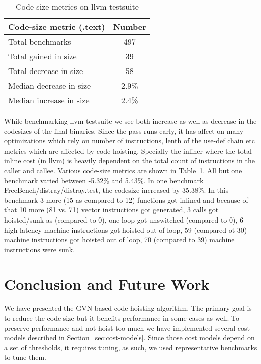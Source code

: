 \documentclass{sig-alternate}
\begin{document}
\begin{table}[h!]
  \begin{center}
    \begin{tabular}{|l|c|}
      \hline
      Code-size metric  (.text)                   & Number   \\\hline
      Total  benchmarks                           & 497      \\\hline
      Total  gained in size                       & 39       \\\hline
      Total  decrease in size                     & 58       \\\hline
      Median decrease in size                     & 2.9\%    \\\hline
      Median increase in size                     & 2.4\%    \\\hline
    \end{tabular}
  \end{center}
  \caption{Code size metrics on llvm-testsuite}
  \label{tab:code-size}
\end{table}

While benchmarking llvm-testsuite we see both increase as well as decrease in
the codesizes of the final binaries. Since the pass runs early, it has affect on
many optimizations which rely on number of instructions, lenth of the use-def
chain etc metrics which are affected by code-hoisting. Specially the inliner
where the total inline cost (in llvm) is heavily dependent on the total count of
instructions in the caller and callee. Various code-size metrics are shown in
Table~\ref{tab:code-size}. All but one benchmark varied between -5.32\% and
5.43\%.  In one benchmark FreeBench/distray/distray.test, the codesize increased
by 35.38\%. In this benchmark 3 more (15 as compared to 12) functions got
inlined and because of that 10 more (81 vs. 71) vector instructions got
generated, 3 calls got hoisted/sunk as (compared to 0), one loop got unswitched
(compared to 0), 6 high latency machine instructions got hoisted out of loop, 59
(compared ot 30) machine instructions got hoisted out of loop, 70 (compared to
39) machine instructions were sunk.

\section{Conclusion and Future Work}
\label{sec:future-work}
We have presented the GVN based code hoisting algorithm. The primary goal is to
reduce the code size but it benefits performance in some cases as well. To
preserve performance and not hoist too much we have implemented several cost
models described in Section~\ref{sec:cost-models}. Since those cost models
depend on a set of thresholds, it requires tuning, as such, we used
representative benchmarks to tune them.
\end{document}
